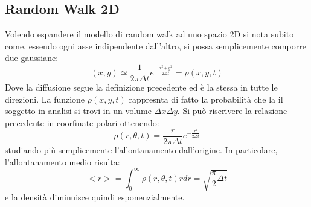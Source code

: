 \documentclass[12pt, a4paper]{book}
\theoremstyle{theorem}
\begin{document}
			\subsection{Random Walk 2D}
				Volendo espandere il modello di random walk ad uno spazio 2D si nota subito come, essendo ogni asse indipendente dall'altro, si possa semplicemente comporre due gaussiane:\\
				\begin{equation}
					(x,y)\simeq\frac{1}{2\pi\Delta t}e^{-\frac{x^2+y^2}{2\Delta t}}=\rho(x,y,t)
				\end{equation}
				Dove la diffusione segue la definizione precedente ed è la stessa in tutte le direzioni.
				La funzione $\rho(x,y,t)$ rappresnta di fatto la probabilità che la il soggetto in analisi si trovi in un volume $\Delta x\Delta y$.
				Si può riscrivere la relazione precedente in coorfinate polari ottenendo:
				\begin{equation}
					\rho(r,\theta,t)=\frac{r}{2\pi\Delta t}e^{-\frac{r^2}{2\Delta t}}
				\end{equation}
				studiando più semplicemente l'allontanamento dall'origine.
				In particolare, l'allontanamento medio risulta:
				\begin{equation}
					<r>=\int_0^\infty\rho(r,\theta,t)rdr=\sqrt{\frac{\pi}{2}\Delta t}
				\end{equation}
				e la densità diminuisce quindi esponenzialmente.
\end{document}
